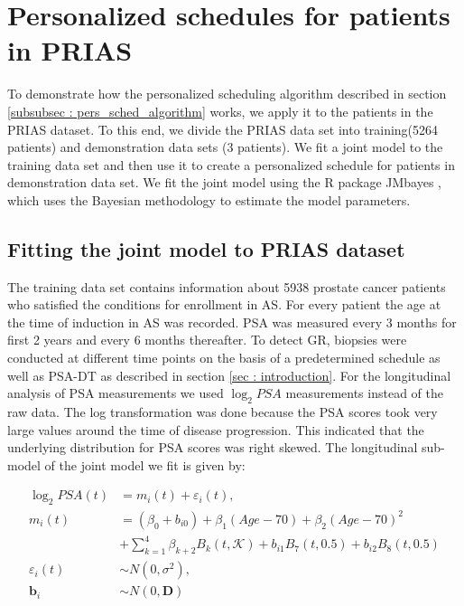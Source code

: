 
\section{Personalized schedules for patients in PRIAS}
\label{sec : pers_schedule_PRIAS}
To demonstrate how the personalized scheduling algorithm described in section \ref{subsubsec : pers_sched_algorithm} works, we apply it to the patients in the PRIAS dataset. To this end, we divide the PRIAS data set into training(5264 patients) and demonstration data sets (3 patients). We fit a joint model to the training data set and then use it to create a personalized schedule for patients in demonstration data set. We fit the joint model using the R package JMbayes \citep{rizopoulosJMbayes}, which uses the Bayesian methodology to estimate the model parameters.

\subsection{Fitting the joint model to PRIAS dataset}
\label{subsec : jm_fit_prias}
The training data set contains information about 5938 prostate cancer patients who satisfied the conditions for enrollment in AS. For every patient the age at the time of induction in AS was recorded. PSA was measured every 3 months for first 2 years and every 6 months thereafter. To detect GR, biopsies were conducted at different time points on the basis of a predetermined schedule as well as PSA-DT as described in section \ref{sec : introduction}. For the longitudinal analysis of PSA measurements we used $\log_2 PSA$ measurements instead of the raw data. The log transformation was done because the PSA scores took very large values around the time of disease progression. This indicated that the underlying distribution for PSA scores was right skewed. The longitudinal sub-model of the joint model we fit is given by:

\begin{align*}
\log_2 PSA(t) &= m_i(t) + \varepsilon_i(t), \\
m_i(t) &= (\beta_0 + b_{i0}) + \beta_1 (Age-70) + \beta_2 (Age-70)^2\\ 
&+ \sum_{k=1}^4 \beta_{k+2} B_k(t,\mathcal{K}) + b_{i1} B_7(t, 0.5) + b_{i2} B_8(t, 0.5) \\
\varepsilon_i(t) & \sim N(0, \sigma^2),\\
\boldsymbol{b}_i & \sim N(0, \boldsymbol{D})
\end{align*}


